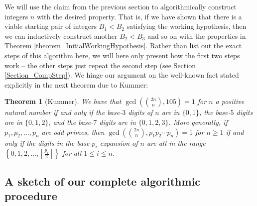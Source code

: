 \documentclass[12pt]{article}
\newtheorem{theorem}{Theorem}
\begin{document}
We will use the claim from the previous section to algorithmically construct
integers $n$ with the desired property.  That is, if we have shown that there is a viable 
starting pair of integers $B_1 < B_2$ satisfying the working hypothesis, then we can inductively 
construct another $B_2 < B_3$ and so on with the properties in 
Theorem \ref{theorem_InitialWorkingHypothesis}. 
Rather than list out the exact
steps of this algorithm here, we will here only present how the first two 
steps work -- the other steps just repeat the second step (see Section \ref{Section_CompStep}).
We hinge our argument on the well-known fact stated explicitly in the next theorem due to Kummer:

\begin{theorem}[Kummer]
\label{theorem_Kummer} 
We have that $\gcd({2n \choose n},105) = 1$ for $n$ a positive natural number if and
only if the base-$3$ digits of $n$ are in $\{0,1\}$,
the base-$5$ digits are in $\{0,1,2\}$, and the base-$7$ digits are in 
$\{0,1,2,3\}$. More generally, if $p_1,p_2,\ldots,p_n$ are odd primes, then 
$\gcd({2n \choose n},p_1p_2\cdots p_n) = 1$ for $n \geq 1$ if and only if the digits in the 
base-$p_i$ expansion of $n$ are all in the range 
$\left\{0,1,2,\ldots,\left\lfloor \frac{p_i}{2} \right\rfloor\right\}$ 
for all $1 \leq i \leq n$. 
\end{theorem} 

\subsection{A sketch of our complete algorithmic procedure} 
\end{document}
